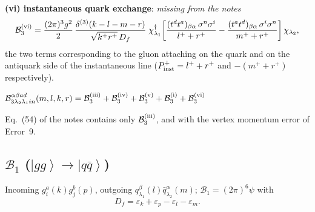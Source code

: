 \documentclass[11pt]{article}
\newcommand{\eps}{\varepsilon}
\newcommand{\dg}{\dagger}
\newcommand{\dthree}{\delta^{(3)}}
\newcommand{\ket}[1]{\left|#1\right\rangle}
\newcommand{\qk}[3]{q^{#1}_{#2}(#3)}
\newcommand{\aqk}[3]{\bar q^{#1}_{#2}(#3)}
\newcommand{\gl}[3]{g^{#1}_{#2}(#3)}
\begin{document}
\begin{res}
\textbf{(vi) instantaneous quark exchange}: \emph{missing from the notes}
\begin{equation}
\mathcal B_{3}^{(\rm vi)}=\frac{(2\pi)^{3}g^{2}}{2}\,
\frac{\dthree(k-l-m-r)}{\sqrt{k^{+}r^{+}}\,D_{f}}\;
\chi^{\dg}_{\lambda_1}\!\left[\frac{(t^{d}t^{a})_{\beta\alpha}\,\sigma^{n}\sigma^{i}}{l^{+}+r^{+}}
-\frac{(t^{a}t^{d})_{\beta\alpha}\,\sigma^{i}\sigma^{n}}{m^{+}+r^{+}}\right]\chi_{\lambda_2},
\end{equation}
the two terms corresponding to the gluon attaching on the quark and on the antiquark side of the
instantaneous line ($P^{+}_{\rm inst}=l^{+}+r^{+}$ and $-(m^{+}+r^{+})$ respectively).

\medskip
\centerline{$\displaystyle
\mathcal B^{\alpha\beta ad}_{3\lambda_2\lambda_1 in}(m,l,k,r)=
\mathcal B_{3}^{(\rm iii)}+\mathcal B_{3}^{(\rm iv)}+\mathcal B_{3}^{(\rm v)}
+\mathcal B_{3}^{(\rm i)}+\mathcal B_{3}^{(\rm vi)}$}
\end{res}

\noindent
Eq.~(54) of the notes contains only $\mathcal B_{3}^{(\rm iii)}$, and with the vertex momentum
error of Error~9.

\subsection{$\mathcal B_1$ ($\ket{gg}\to\ket{q\bar q}$)}

Incoming $\gl{a}{i}{k}\gl{b}{j}{p}$, outgoing $\qk{\beta}{\lambda_1}{l}\aqk{\alpha}{\lambda_2}{m}$;
$\mathcal B_{1}=(2\pi)^{6}\psi$ with
\begin{equation}
D_{f}=\eps_{k}+\eps_{p}-\eps_{l}-\eps_{m}.
\end{equation}
\end{document}
